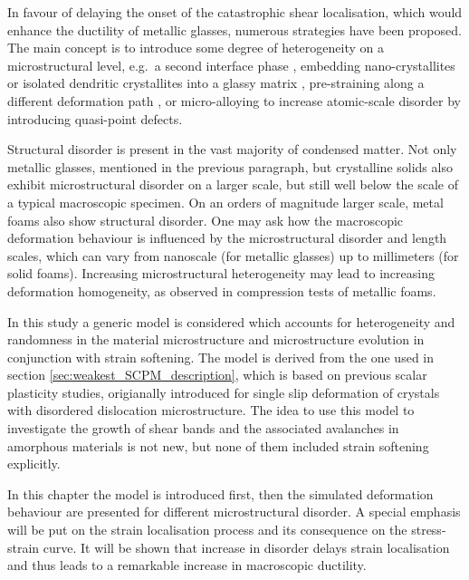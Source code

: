 In favour of delaying the onset of the catastrophic shear localisation, which would enhance the ductility of metallic glasses, numerous strategies have been proposed. The main concept is to introduce some degree of heterogeneity on a microstructural level, e.g.\ a second interface phase \cite{adibi2013transition}, embedding nano-crystallites or isolated dendritic crystallites into a glassy matrix \cite{das2005work,hofmann2008designing,XU2016314}, pre-straining along a different deformation path \cite{zhou2014non,WU2015136}, or micro-alloying to increase atomic-scale disorder by introducing quasi-point defects\cite{qiao2016understanding}.

Structural disorder is present in the vast majority of condensed matter. Not only metallic glasses, mentioned in the previous paragraph, but crystalline solids also exhibit microstructural disorder on a larger scale, but still well below the scale of a typical macroscopic specimen. On an orders of magnitude larger scale, metal foams also show structural disorder. One may ask how the macroscopic deformation behaviour is influenced by the microstructural disorder and length scales, which can vary from nanoscale (for metallic glasses) up to millimeters (for solid foams). Increasing microstructural heterogeneity may lead to increasing deformation homogeneity, as observed in compression tests of metallic foams\cite{ZAISER201338}.

In this study a generic model is considered which accounts for heterogeneity and randomness in the material microstructure and microstructure evolution in conjunction with strain softening. The model is derived from the one used in section \ref{sec:weakest_SCPM_description}, which is based on previous scalar plasticity studies\cite{1742-5468-2005-08-P08004,ZAISER20061432}, origianally introduced for single slip deformation of crystals with disordered dislocation microstructure. The idea to use this model to investigate the growth of shear bands and the associated avalanches in amorphous materials is not new\cite{TALAMALI2012275,PhysRevE.88.062403,1742-5468-2015-2-P02011,PhysRevLett.103.065501}, but none of them included strain softening explicitly.

In this chapter the model is introduced first, then the simulated deformation behaviour are presented for different microstructural disorder. A special emphasis will be put on the strain localisation process and its consequence on the stress-strain curve. It will be shown that increase in disorder delays strain localisation and thus leads to a remarkable increase in macroscopic ductility.

